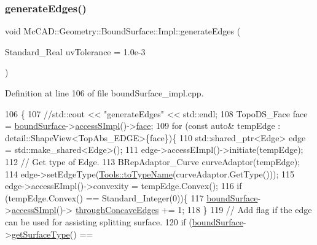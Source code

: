 \subsubsection{\texorpdfstring{generate\+Edges()}{generateEdges()}\hspace{0.1cm}{\footnotesize\ttfamily [1/2]}}
{\footnotesize\ttfamily void Mc\+C\+A\+D\+::\+Geometry\+::\+Bound\+Surface\+::\+Impl\+::generate\+Edges (\begin{DoxyParamCaption}\item[{Standard\+\_\+\+Real}]{uv\+Tolerance = {\ttfamily 1.0e-\/3} }\end{DoxyParamCaption})}



Definition at line 106 of file bound\+Surface\+\_\+impl.\+cpp.


\begin{DoxyCode}
106                                                                      \{
107     \textcolor{comment}{//std::cout << "generateEdges" << std::endl;}
108     TopoDS\_Face face = \hyperlink{classMcCAD_1_1Geometry_1_1BoundSurface_1_1Impl_a6e9a9a98f22310d56cf46937aca346e3}{boundSurface}->\hyperlink{classMcCAD_1_1Geometry_1_1Surface_a989de1f9ebe3de043412014ed25e52eb}{accessSImpl}()->\hyperlink{classMcCAD_1_1Geometry_1_1Surface_1_1Impl_abf7c4dc859404ce42b425c7d6b578f69}{face};
109     \textcolor{keywordflow}{for} (\textcolor{keyword}{const} \textcolor{keyword}{auto}& tempEdge : detail::ShapeView<TopAbs\_EDGE>\{face\})\{
110         std::shared\_ptr<Edge> edge = std::make\_shared<Edge>();
111         edge->accessEImpl()->initiate(tempEdge);
112         \textcolor{comment}{// Get type of Edge.}
113         BRepAdaptor\_Curve curveAdaptor(tempEdge);
114         edge->setEdgeType(\hyperlink{namespaceMcCAD_1_1Tools_a2c3c43d2878c73f69424e7b32f87bb2b}{Tools::toTypeName}(curveAdaptor.GetType()));
115         edge->accessEImpl()->convexity = tempEdge.Convex();
116         \textcolor{keywordflow}{if} (tempEdge.Convex() == Standard\_Integer(0))\{
117             \hyperlink{classMcCAD_1_1Geometry_1_1BoundSurface_1_1Impl_a6e9a9a98f22310d56cf46937aca346e3}{boundSurface}->\hyperlink{classMcCAD_1_1Geometry_1_1Surface_a989de1f9ebe3de043412014ed25e52eb}{accessSImpl}()->
      \hyperlink{classMcCAD_1_1Geometry_1_1Surface_1_1Impl_ab1f136a1e90ff9215c1f229070c8b9b7}{throughConcaveEdges} += 1;
118         \}
119         \textcolor{comment}{// Add flag if the edge can be used for assisting splitting surface.}
120         \textcolor{keywordflow}{if} (\hyperlink{classMcCAD_1_1Geometry_1_1BoundSurface_1_1Impl_a6e9a9a98f22310d56cf46937aca346e3}{boundSurface}->\hyperlink{classMcCAD_1_1Geometry_1_1Surface_ac81308cae2d3fd458dfa311adea23688}{getSurfaceType}() == 

\end{DoxyCode}

